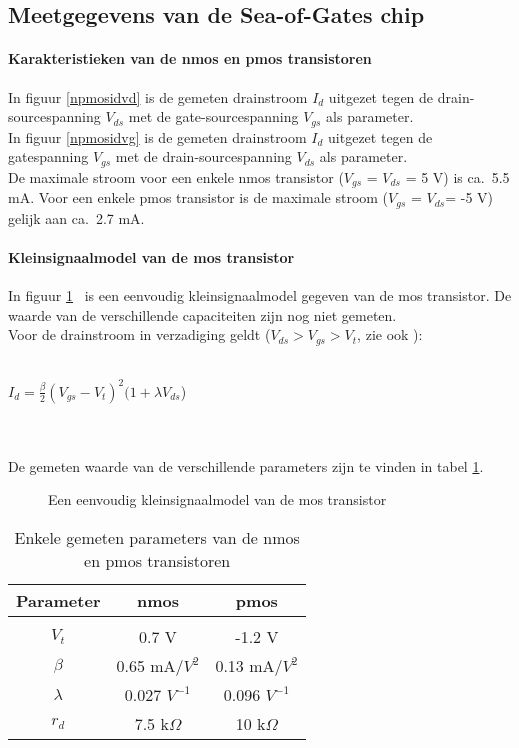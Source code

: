 \subsection{Meetgegevens van de Sea-of-Gates chip}

\paragraph{Karakteristieken van de nmos en pmos transistoren}

In figuur \ref{npmosidvd} is de gemeten drainstroom $I_d$ uitgezet 
tegen de drain-sourcespanning $V_{ds}$ met de gate-sourcespanning $V_{gs}$ als parameter.\\
In figuur \ref{npmosidvg} is de gemeten drainstroom $I_d$ uitgezet tegen de gatespanning $V_{gs}$ met de drain-sourcespanning $V_{ds}$ als parameter.\\
De maximale stroom voor een enkele nmos transistor ($V_{gs}$ = $V_{ds}$ = 5 V) is ca.~5.5 mA. Voor een enkele pmos transistor is de maximale stroom ($V_{gs}$ = $V_{ds}$= -5 V) gelijk aan ca.~2.7 mA. 
\paragraph{Kleinsignaalmodel van de mos transistor}

In figuur \ref{ks-model}~ is een eenvoudig kleinsignaalmodel gegeven van de
mos transistor. De waarde van de verschillende capaciteiten zijn nog
niet gemeten.\\
Voor de drainstroom in verzadiging geldt ($V_{ds} > V_{gs} > V_t$, zie ook \cite{GS}):\\
\\
\centerline{$I_d = \frac{\beta}{2}(V_{gs}-V_t)^2(1+\lambda V_{ds}$)}\\
\\
De gemeten waarde van de verschillende parameters zijn te vinden in tabel \ref{mostabel}.

\begin{figure}[hbt]
\centerline{}
\caption{\label{ks-model} Een eenvoudig kleinsignaalmodel van de mos transistor}
\end{figure}

\begin{table}[hbt]
\begin{center}
\begin{tabular}{ccc}
\hline
Parameter & nmos & pmos\\
\hline\\
$V_t$ & 0.7 V & -1.2 V\\
$\beta$ & 0.65 mA/$V^2$ & 0.13  mA/$V^2$\\
$\lambda$ & 0.027 $V^{-1}$ & 0.096  $V^{-1}$\\
$r_d$ & 7.5 k$\Omega$ & 10  k$\Omega$\\
\hline
\end{tabular}
\caption{\label{mostabel} Enkele gemeten parameters van de nmos en pmos transistoren}
\end{center}
\end{table}

